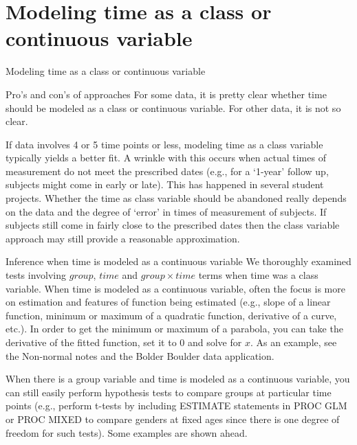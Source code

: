 \documentclass[
  9pt,
  ignorenonframetext,
]{beamer}
\begin{document}
\hypertarget{modeling-time-as-a-class-or-continuous-variable}{%
\section{Modeling time as a class or continuous
variable}\label{modeling-time-as-a-class-or-continuous-variable}}

\begin{frame}{Modeling time as a class or continuous variable}
\protect\hypertarget{modeling-time-as-a-class-or-continuous-variable-1}{}
\begin{block}{Pro's and con's of approaches}
\protect\hypertarget{pros-and-cons-of-approaches}{}
For some data, it is pretty clear whether time should be modeled as a
class or continuous variable. For other data, it is not so clear.

If data involves 4 or 5 time points or less, modeling time as a class
variable typically yields a better fit. A wrinkle with this occurs when
actual times of measurement do not meet the prescribed dates (e.g., for
a `1-year' follow up, subjects might come in early or late). This has
happened in several student projects. Whether the time as class variable
should be abandoned really depends on the data and the degree of `error'
in times of measurement of subjects. If subjects still come in fairly
close to the prescribed dates then the class variable approach may still
provide a reasonable approximation.
\end{block}
\end{frame}

\begin{frame}{Inference when time is modeled as a continuous variable}
\protect\hypertarget{inference-when-time-is-modeled-as-a-continuous-variable}{}
We thoroughly examined tests involving \(group\), \(time\) and
\(group \times time\) terms when time was a class variable. When time is
modeled as a continuous variable, often the focus is more on estimation
and features of function being estimated (e.g., slope of a linear
function, minimum or maximum of a quadratic function, derivative of a
curve, etc.). In order to get the minimum or maximum of a parabola, you
can take the derivative of the fitted function, set it to 0 and solve
for \(x\). As an example, see the Non-normal notes and the Bolder
Boulder data application.

When there is a group variable and time is modeled as a continuous
variable, you can still easily perform hypothesis tests to compare
groups at particular time points (e.g., perform t-tests by including
ESTIMATE statements in PROC GLM or PROC MIXED to compare genders at
fixed ages since there is one degree of freedom for such tests). Some
examples are shown ahead.
\end{frame}
\end{document}
